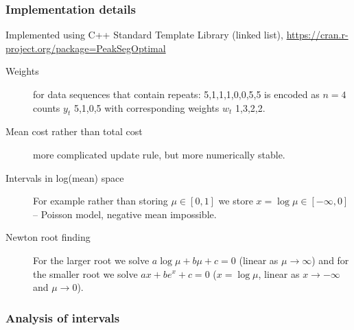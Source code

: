 \documentclass{beamer}
\begin{document}



\begin{frame}
  \frametitle{Implementation details}
  Implemented using C++ Standard Template Library (linked list),
  \url{https://cran.r-project.org/package=PeakSegOptimal}
\begin{description}
\item[Weights] for data sequences that contain repeats:
  5,1,1,1,0,0,5,5 is encoded as $n=4$ counts $y_t$ 5,1,0,5 with
  corresponding weights $w_t$ 1,3,2,2.
\item[Mean cost rather than total cost] more complicated update rule,
  but more numerically stable.
\item[Intervals in log(mean) space] For example rather than storing
  $\mu\in[0,1]$ we store $x=\log\mu\in[-\infty, 0]$ -- Poisson model,
  negative mean impossible.
\item[Newton root finding] For the larger root we solve
  $a\log\mu + b\mu + c = 0$ (linear as $\mu\rightarrow\infty$) and for
  the smaller root we solve $a x + be^x + c = 0$ ($x=\log \mu$, linear
  as $x\rightarrow -\infty$ and $\mu\rightarrow 0$). 
\end{description}
  
\end{frame}


\begin{frame}
  \frametitle{Analysis of intervals}
  
\end{frame}
\end{document}
